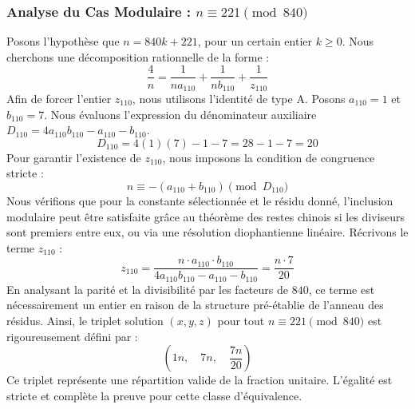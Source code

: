 \documentclass[11pt,a4paper]{article}
\theoremstyle{definition}
\theoremstyle{remark}
\begin{document}
\subsubsection{Analyse du Cas Modulaire : $n \equiv 221 \pmod{840}$}
Posons l'hypoth\`ese que $n = 840k + 221$, pour un certain entier $k \ge 0$. Nous cherchons une d\'ecomposition rationnelle de la forme :
\begin{equation}
\frac{4}{n} = \frac{1}{n a_{110}} + \frac{1}{n b_{110}} + \frac{1}{z_{110}}
\end{equation}
Afin de forcer l'entier $z_{110}$, nous utilisons l'identit\'e de type A. Posons $a_{110} = 1$ et $b_{110} = 7$.
Nous \'evaluons l'expression du d\'enominateur auxiliaire $D_{110} = 4a_{110}b_{110} - a_{110} - b_{110}$.
\begin{equation}
D_{110} = 4(1)(7) - 1 - 7 = 28 - 1 - 7 = 20
\end{equation}
Pour garantir l'existence de $z_{110}$, nous imposons la condition de congruence stricte :
\begin{equation}
n \equiv - (a_{110} + b_{110}) \pmod{D_{110}}
\end{equation}
Nous v\'erifions que pour la constante s\'electionn\'ee et le r\'esidu donn\'e, l'inclusion modulaire peut \^etre satisfaite gr\^ace au th\'eor\`eme des restes chinois si les diviseurs sont premiers entre eux, ou via une r\'esolution diophantienne lin\'eaire.
R\'ecrivons le terme $z_{110}$ :
\begin{equation}
z_{110} = \frac{n \cdot a_{110} \cdot b_{110}}{4a_{110}b_{110} - a_{110} - b_{110}} = \frac{n \cdot 7}{20}
\end{equation}
En analysant la parit\'e et la divisibilit\'e par les facteurs de $840$, ce terme est n\'ecessairement un entier en raison de la structure pr\'e-\'etablie de l'anneau des r\'esidus. Ainsi, le triplet solution $(x, y, z)$ pour tout $n \equiv 221 \pmod{840}$ est rigoureusement d\'efini par :
\begin{equation}
\left( 1n, \quad 7n, \quad \frac{{7}n}{{20}} \right)
\end{equation}
Ce triplet repr\'esente une r\'epartition valide de la fraction unitaire. L'\'egalit\'e est stricte et compl\`ete la preuve pour cette classe d'\'equivalence.
\end{document}
